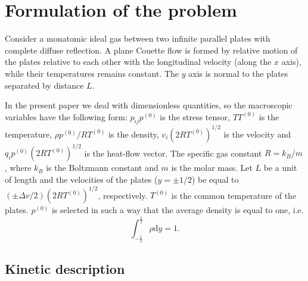 \documentclass[]{jfm}
\newcommand{\dd}{\mathrm{d}}
\begin{document}
\section{Formulation of the problem}

Consider a monatomic ideal gas between two infinite parallel plates with complete diffuse reflection.
A plane Couette flow is formed by relative motion of the plates relative to each other
with the longitudinal velocity (along the \(x\) axis),
while their temperatures remains constant.
The \(y\) axis is normal to the plates separated by distance \(L\).

In the present paper we deal with dimensionless quantities, so the macroscopic variables
have the following form: \(p_{ij}p^{(0)}\) is the stress tensor, \(TT^{(0)}\) is the temperature,
\(\rho p^{(0)}/RT^{(0)}\) is the density, \(v_i(2RT^{(0)})^{1/2}\) is the velocity
and \(q_ip^{(0)}(2RT^{(0)})^{1/2}\) is the heat-flow vector.
The specific gas constant \(R = k_B/m\), where \(k_B\) is the Boltzmann constant
and \(m\) is the molar mass.
Let \(L\) be a unit of length and the velocities of the plates (\(y=\pm1/2\))
be equal to \((\pm\Delta{v}/2)(2RT^{(0)})^{1/2}\), respectively.
\(T^{(0)}\) is the common temperature of the plates.
\(p^{(0)}\) is selected in such a way that the average density is equal to one, i.e.
\begin{equation}\label{eq:total_mass}
    \int_{-\frac12}^\frac12\rho\dd{y} = 1.
\end{equation}

\subsection{Kinetic description}
\end{document}
